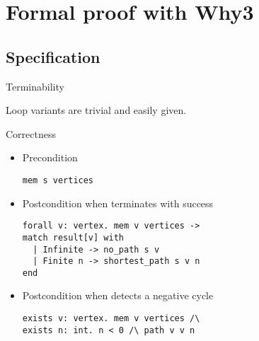 \documentclass{beamer}
\begin{document}
\section{Formal proof with Why3}
\frame{\sectionpage}

\subsection{Specification}

\begin{frame}[fragile]{Terminability}

Loop variants are trivial and easily given.\vspace*{12pt}

\begin{algorithmic}[1]
\ENDFOR
\ENDFOR
{}
\ENDIF
\ENDFOR
{}
\end{algorithmic}

\end{frame}

\begin{frame}[fragile]{Correctness}

\begin{itemize}

\item \alert{Precondition}

\begin{lstlisting}[language=why3]
mem s vertices
\end{lstlisting}

\item \alert{Postcondition} when terminates with success
\begin{lstlisting}[language=why3]
forall v: vertex. mem v vertices ->
match result[v] with
  | Infinite -> no_path s v
  | Finite n -> shortest_path s v n
end
\end{lstlisting}

\item \alert{Postcondition} when detects a negative cycle
\begin{lstlisting}[language=why3]
exists v: vertex. mem v vertices /\
exists n: int. n < 0 /\ path v v n
\end{lstlisting}
\end{itemize}

\end{frame}
\end{document}
